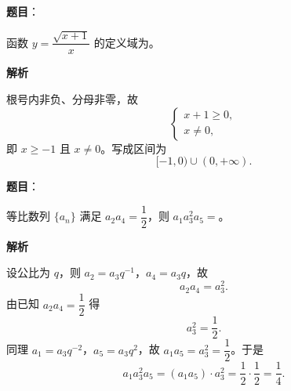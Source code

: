 \begin{answer}

\textbf{题目}：

函数 $y=\dfrac{\sqrt{x+1}}{x}$ 的定义域为\gkblank{}。

\textbf{解析}

根号内非负、分母非零，故
\nopagebreak[4]
\[\begin{cases}x+1\geqslant0,\\ x\neq0,\end{cases}\]
即 $x\geqslant-1$ 且 $x\neq0$。写成区间为
\nopagebreak[4]
\[[-1,0)\cup(0,+\infty).\]

\gkanswer{答案：$[-1,0)\cup(0,+\infty)$。需 $x+1\geqslant0$ 且 $x\neq0$。}

\end{answer}
\begin{answer}

\textbf{题目}：

等比数列 $\{a_n\}$ 满足 $a_2a_4=\dfrac12$，则 $a_1a_3^2a_5=$\gkblank{}。

\textbf{解析}

设公比为 $q$，则 $a_2=a_3q^{-1}$，$a_4=a_3q$，故
\nopagebreak[4]
\[a_2a_4=a_3^2.\]
由已知 $a_2a_4=\dfrac12$ 得
\nopagebreak[4]
\[a_3^2=\frac12.\]
同理 $a_1=a_3q^{-2}$，$a_5=a_3q^2$，故 $a_1a_5=a_3^2=\dfrac12$。于是
\nopagebreak[4]
\[a_1a_3^2a_5=(a_1a_5)\cdot a_3^2=\frac12\cdot\frac12=\frac14.\]


\end{answer}
